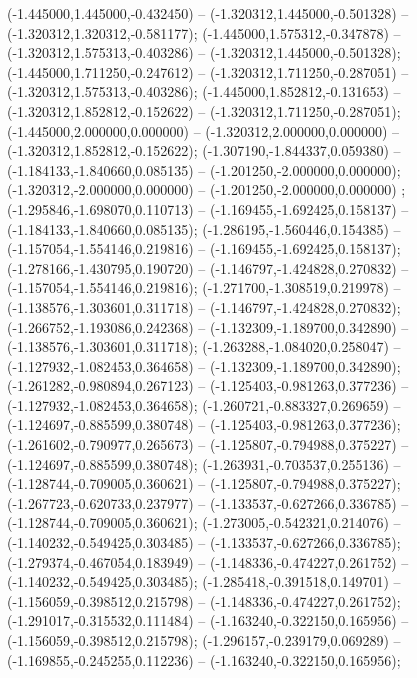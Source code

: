  (-1.445000,1.445000,-0.432450) -- (-1.320312,1.445000,-0.501328) -- (-1.320312,1.320312,-0.581177);
 (-1.445000,1.575312,-0.347878) -- (-1.320312,1.575313,-0.403286) -- (-1.320312,1.445000,-0.501328);
 (-1.445000,1.711250,-0.247612) -- (-1.320312,1.711250,-0.287051) -- (-1.320312,1.575313,-0.403286);
 (-1.445000,1.852812,-0.131653) -- (-1.320312,1.852812,-0.152622) -- (-1.320312,1.711250,-0.287051);
 (-1.445000,2.000000,0.000000) -- (-1.320312,2.000000,0.000000) -- (-1.320312,1.852812,-0.152622);
 (-1.307190,-1.844337,0.059380) -- (-1.184133,-1.840660,0.085135) -- (-1.201250,-2.000000,0.000000);
 (-1.320312,-2.000000,0.000000) -- (-1.201250,-2.000000,0.000000) ;
 (-1.295846,-1.698070,0.110713) -- (-1.169455,-1.692425,0.158137) -- (-1.184133,-1.840660,0.085135);
 (-1.286195,-1.560446,0.154385) -- (-1.157054,-1.554146,0.219816) -- (-1.169455,-1.692425,0.158137);
 (-1.278166,-1.430795,0.190720) -- (-1.146797,-1.424828,0.270832) -- (-1.157054,-1.554146,0.219816);
 (-1.271700,-1.308519,0.219978) -- (-1.138576,-1.303601,0.311718) -- (-1.146797,-1.424828,0.270832);
 (-1.266752,-1.193086,0.242368) -- (-1.132309,-1.189700,0.342890) -- (-1.138576,-1.303601,0.311718);
 (-1.263288,-1.084020,0.258047) -- (-1.127932,-1.082453,0.364658) -- (-1.132309,-1.189700,0.342890);
 (-1.261282,-0.980894,0.267123) -- (-1.125403,-0.981263,0.377236) -- (-1.127932,-1.082453,0.364658);
 (-1.260721,-0.883327,0.269659) -- (-1.124697,-0.885599,0.380748) -- (-1.125403,-0.981263,0.377236);
 (-1.261602,-0.790977,0.265673) -- (-1.125807,-0.794988,0.375227) -- (-1.124697,-0.885599,0.380748);
 (-1.263931,-0.703537,0.255136) -- (-1.128744,-0.709005,0.360621) -- (-1.125807,-0.794988,0.375227);
 (-1.267723,-0.620733,0.237977) -- (-1.133537,-0.627266,0.336785) -- (-1.128744,-0.709005,0.360621);
 (-1.273005,-0.542321,0.214076) -- (-1.140232,-0.549425,0.303485) -- (-1.133537,-0.627266,0.336785);
 (-1.279374,-0.467054,0.183949) -- (-1.148336,-0.474227,0.261752) -- (-1.140232,-0.549425,0.303485);
 (-1.285418,-0.391518,0.149701) -- (-1.156059,-0.398512,0.215798) -- (-1.148336,-0.474227,0.261752);
 (-1.291017,-0.315532,0.111484) -- (-1.163240,-0.322150,0.165956) -- (-1.156059,-0.398512,0.215798);
 (-1.296157,-0.239179,0.069289) -- (-1.169855,-0.245255,0.112236) -- (-1.163240,-0.322150,0.165956);
